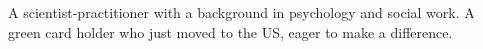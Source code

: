 

\begin{cvparagraph}

A scientist-practitioner with a background in psychology and social work. A green card holder who just moved to the US, eager to make a difference.
\end{cvparagraph}


